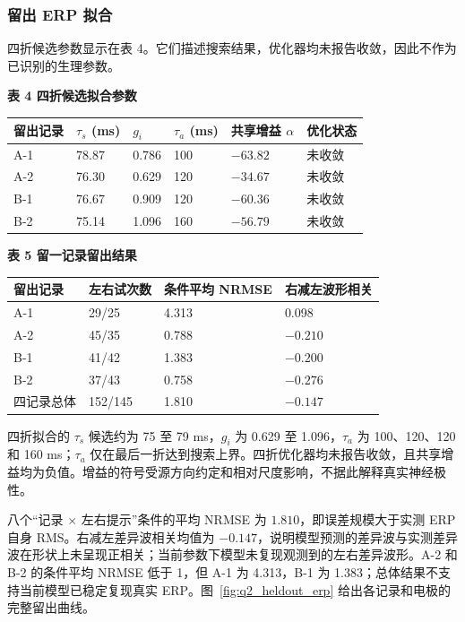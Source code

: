 \subsubsection{留出 ERP 拟合}

四折候选参数显示在表 4。它们描述搜索结果，优化器均未报告收敛，因此不作为已识别的生理参数。


\textbf{表 4 四折候选拟合参数}

\begin{longtable}[]{@{}llllll@{}}
\toprule
留出记录 & \(\tau_s\) (ms) & \(g_i\) & \(\tau_a\) (ms) & 共享增益 \(\alpha\) & 优化状态 \\
\midrule
\endhead
A-1 & 78.87 & 0.786 & 100 & \(-63.82\) & 未收敛 \\
A-2 & 76.30 & 0.629 & 120 & \(-34.67\) & 未收敛 \\
B-1 & 76.67 & 0.909 & 120 & \(-60.36\) & 未收敛 \\
B-2 & 75.14 & 1.096 & 160 & \(-56.79\) & 未收敛 \\
\bottomrule
\end{longtable}

\textbf{表 5 留一记录留出结果}

\begin{longtable}[]{@{}llll@{}}
\toprule
留出记录 & 左右试次数 & 条件平均 NRMSE & 右减左波形相关 \\
\midrule
\endhead
A-1 & 29/25 & 4.313 & 0.098 \\
A-2 & 45/35 & 0.788 & \(-0.210\) \\
B-1 & 41/42 & 1.383 & \(-0.200\) \\
B-2 & 37/43 & 0.758 & \(-0.276\) \\
四记录总体 & 152/145 & 1.810 & \(-0.147\) \\
\bottomrule
\end{longtable}

四折拟合的 \(\tau_s\) 候选约为 75 至 79 ms，\(g_i\) 为 0.629 至 1.096，\(\tau_a\) 为 100、120、120 和 160 ms；\(\tau_a\) 仅在最后一折达到搜索上界。四折优化器均未报告收敛，且共享增益均为负值。增益的符号受源方向约定和相对尺度影响，不据此解释真实神经极性。

八个“记录 \(\times\) 左右提示”条件的平均 NRMSE 为 \(1.810\)，即误差规模大于实测 ERP 自身 RMS。右减左差异波相关均值为 \(-0.147\)，说明模型预测的差异波与实测差异波在形状上未呈现正相关；当前参数下模型未复现观测到的左右差异波形。A-2 和 B-2 的条件平均 NRMSE 低于 1，但 A-1 为 4.313，B-1 为 1.383；总体结果不支持当前模型已稳定复现真实 ERP。图~\ref{fig:q2_heldout_erp} 给出各记录和电极的完整留出曲线。

